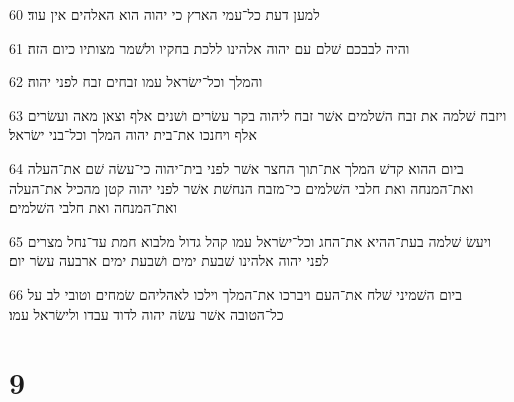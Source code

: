 \par 60 למען דעת כל־עמי הארץ כי יהוה הוא האלהים אין עוד׃
\par 61 והיה לבבכם שׁלם עם יהוה אלהינו ללכת בחקיו ולשׁמר מצותיו כיום הזה׃
\par 62 והמלך וכל־ישׂראל עמו זבחים זבח לפני יהוה׃
\par 63 ויזבח שׁלמה את זבח השׁלמים אשׁר זבח ליהוה בקר עשׂרים ושׁנים אלף וצאן מאה ועשׂרים אלף ויחנכו את־בית יהוה המלך וכל־בני ישׂראל׃
\par 64 ביום ההוא קדשׁ המלך את־תוך החצר אשׁר לפני בית־יהוה כי־עשׂה שׁם את־העלה ואת־המנחה ואת חלבי השׁלמים כי־מזבח הנחשׁת אשׁר לפני יהוה קטן מהכיל את־העלה ואת־המנחה ואת חלבי השׁלמים׃
\par 65 ויעשׂ שׁלמה בעת־ההיא את־החג וכל־ישׂראל עמו קהל גדול מלבוא חמת עד־נחל מצרים לפני יהוה אלהינו שׁבעת ימים ושׁבעת ימים ארבעה עשׂר יום׃
\par 66 ביום השׁמיני שׁלח את־העם ויברכו את־המלך וילכו לאהליהם שׂמחים וטובי לב על כל־הטובה אשׁר עשׂה יהוה לדוד עבדו ולישׂראל עמו׃

\chapter{9}

